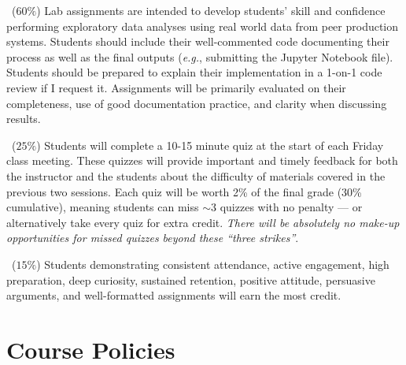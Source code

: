 \documentclass[10pt]{memoir}
\begin{document}
    \begin{description}[itemsep=0pt,labelsep=0pt]
        \item[Lab Assignments]~($60\%$) Lab assignments are intended to develop students' skill and confidence performing exploratory data analyses using real world data from peer production systems. Students should include their well-commented code documenting their process as well as the final outputs (\textit{e.g.}, submitting the Jupyter Notebook file). Students should be prepared to explain their implementation in a 1-on-1 code review if I request it. Assignments will be primarily evaluated on their completeness, use of good documentation practice, and clarity when discussing results.
        \item[Friday quizzes]~($25\%$) Students will complete a 10-15 minute quiz at the start of each Friday class meeting. These quizzes will provide important and timely feedback for both the instructor and the students about the difficulty of materials covered in the previous two sessions. Each quiz will be worth 2\% of the final grade (30\% cumulative), meaning students can miss $\sim$3 quizzes with no penalty --- or alternatively take every quiz for extra credit. \textit{There will be absolutely no make-up opportunities for missed quizzes beyond these ``three strikes''}.  %
        \item[Participation]~($15\%$) Students demonstrating consistent attendance, active engagement, high preparation, deep curiosity, sustained retention, positive attitude, persuasive arguments, and well-formatted assignments will earn the most credit.
    \end{description}

\section{Course Policies}
\end{document}

